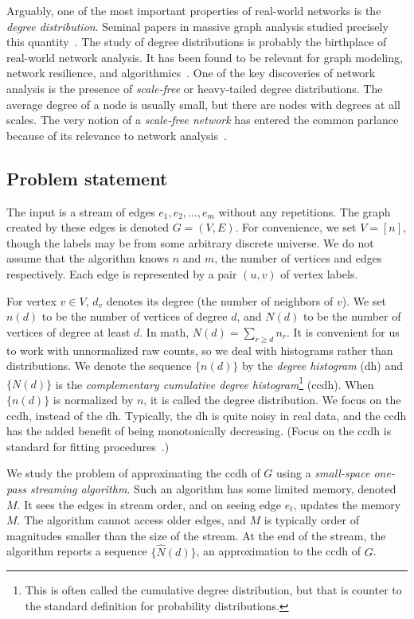 \documentclass[11pt]{article}
\theoremstyle{definition}
\newcommand{\hN}{\widehat{N}}
\begin{document}
Arguably, one of the most important properties of real-world networks is the \emph{degree distribution}. Seminal papers
in massive graph analysis studied precisely this quantity~\cite{BarabasiAlbert99,FFF99,BrKu+00}.
The study of degree distributions
is probably the birthplace of real-world network analysis. It has been found to be relevant for graph modeling, network resilience, and algorithmics~\cite{CoEr+00,NeStWa01,PeFlLa+02,Ne03,Mi03,ChFa06,SeKoPi11}.
One of the key discoveries of network analysis is the presence
of \emph{scale-free} or heavy-tailed degree distributions. The average degree of a node is usually small,
but there are nodes with degrees at all scales. The very notion of a \emph{scale-free network} has entered the common parlance
because of its relevance to network analysis~\cite{Wiki-scale}.

\subsection{Problem statement} \label{sec:problem}

The input is a stream of edges $e_1, e_2, \ldots, e_m$ without any repetitions.
The graph created by these edges is denoted $G = (V,E)$. For convenience,
we set $V = [n]$, though the labels may be from some arbitrary discrete universe.
We do not assume that the algorithm knows $n$ and $m$, the number of vertices
and edges respectively.
Each edge is represented by a pair $(u,v)$ of vertex labels.

For vertex $v \in V$, $d_v$ denotes its degree (the number of neighbors of $v$).
We set $n(d)$ to be the number of vertices of degree $d$, and $N(d)$ to be the number
of vertices of degree at least $d$. In math, $N(d) = \sum_{r \geq d} n_r$.
It is convenient for us to work with unnormalized raw counts, so we deal
with histograms rather than distributions.
We denote the sequence $\{n(d)\}$ by the \emph{degree histogram} (dh) and
$\{N(d)\}$ is the \emph{complementary cumulative degree histogram}\footnote{This is often
called the cumulative degree distribution, but that is counter to the standard
definition for probability distributions.} (ccdh).
When $\{n(d)\}$ is normalized by $n$, it is called the degree distribution.
We focus on the ccdh, instead of the dh. Typically, the dh is quite noisy in real data, and
the ccdh has the added benefit of being monotonically decreasing. (Focus on the ccdh is standard
for fitting procedures~\cite{ClShNe09}.)

We study the problem of approximating the ccdh of $G$ using a \emph{small-space one-pass streaming algorithm}.
Such an algorithm has some limited memory, denoted $M$. It sees the edges in stream order,
and on seeing edge $e_t$, updates the memory $M$. The algorithm cannot access older edges,
and $M$ is typically order of magnitudes smaller than the size of the stream. At the end of the stream,
the algorithm reports a sequence $\{\hN(d)\}$, an approximation to the ccdh of $G$.
\end{document}
